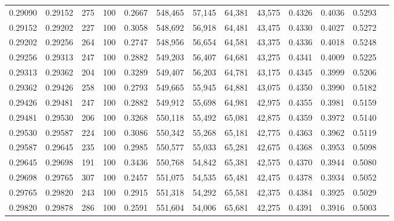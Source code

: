\begin{tabular}{rrrrrrrrrrrrr}
0.29090 & 0.29152 &   275 & 100 &                                     0.2667 & 548,465 &  57,145 &  64,381 &  43,575 & 0.4326 & 0.4036 & 0.5293 \\
0.29152 & 0.29202 &   227 & 100 &                                     0.3058 & 548,692 &  56,918 &  64,481 &  43,475 & 0.4330 & 0.4027 & 0.5272 \\
0.29202 & 0.29256 &   264 & 100 &                                     0.2747 & 548,956 &  56,654 &  64,581 &  43,375 & 0.4336 & 0.4018 & 0.5248 \\
0.29256 & 0.29313 &   247 & 100 &                                     0.2882 & 549,203 &  56,407 &  64,681 &  43,275 & 0.4341 & 0.4009 & 0.5225 \\
0.29313 & 0.29362 &   204 & 100 &                                     0.3289 & 549,407 &  56,203 &  64,781 &  43,175 & 0.4345 & 0.3999 & 0.5206 \\
0.29362 & 0.29426 &   258 & 100 &                                     0.2793 & 549,665 &  55,945 &  64,881 &  43,075 & 0.4350 & 0.3990 & 0.5182 \\
0.29426 & 0.29481 &   247 & 100 &                                     0.2882 & 549,912 &  55,698 &  64,981 &  42,975 & 0.4355 & 0.3981 & 0.5159 \\
0.29481 & 0.29530 &   206 & 100 &                                     0.3268 & 550,118 &  55,492 &  65,081 &  42,875 & 0.4359 & 0.3972 & 0.5140 \\
0.29530 & 0.29587 &   224 & 100 &                                     0.3086 & 550,342 &  55,268 &  65,181 &  42,775 & 0.4363 & 0.3962 & 0.5119 \\
0.29587 & 0.29645 &   235 & 100 &                                     0.2985 & 550,577 &  55,033 &  65,281 &  42,675 & 0.4368 & 0.3953 & 0.5098 \\
0.29645 & 0.29698 &   191 & 100 &                                     0.3436 & 550,768 &  54,842 &  65,381 &  42,575 & 0.4370 & 0.3944 & 0.5080 \\
0.29698 & 0.29765 &   307 & 100 &                                     0.2457 & 551,075 &  54,535 &  65,481 &  42,475 & 0.4378 & 0.3934 & 0.5052 \\
0.29765 & 0.29820 &   243 & 100 &                                     0.2915 & 551,318 &  54,292 &  65,581 &  42,375 & 0.4384 & 0.3925 & 0.5029 \\
0.29820 & 0.29878 &   286 & 100 &                                     0.2591 & 551,604 &  54,006 &  65,681 &  42,275 & 0.4391 & 0.3916 & 0.5003 \\

\end{tabular}
